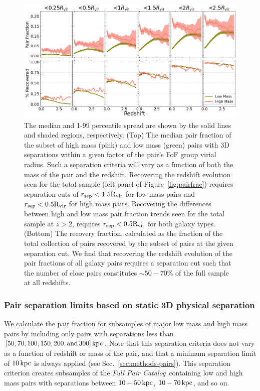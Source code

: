 \documentclass[twocolumn]{aastex631}
\newcommand{\paircat}{\textit{Full Pair Catalog}}
\newcommand{\Rvir}{\ensuremath{\rm R_{vir}}}
\begin{document}
    \begin{figure}[htp]
        \centering
        \includegraphics[width=\textwidth]{pairfrac_vircut.png}
        \caption{\label{fig:vircut}The median and 1-99 percentile spread are shown by the solid lines and shaded regions, respectively. 
        (Top) The median pair fraction of the subset of high mass (pink) and low mass (green) pairs with 3D separations within a given factor of the pair's FoF group virial radius.
        Such a separation criteria will vary as a function of both the mass of the pair and the redshift. 
        Recovering the redshift evolution seen for the total sample (left panel of Figure~\ref{fig:pairfrac}) requires separation cuts of $r_{\mathrm{sep}} < 1.5\Rvir$ for low mass pairs and $r_{\mathrm{sep}} < 0.5\Rvir$ for high mass pairs. 
        Recovering the differences between high and low mass pair fraction trends seen for the total sample at $z>2$, requires $r_{\mathrm{sep}} < 0.5\Rvir$ for both galaxy types. 
        (Bottom) The recovery fraction, calculated as the fraction of the total collection of pairs recovered by the subset of pairs at the given separation cut. 
        We find that recovering the redshift evolution of the pair fractions of all galaxy pairs requires a separation cut such that the number of close pairs constitutes $\sim50-70\%$ of the full sample at all redshifts.
    }
    \end{figure}

\subsubsection{Pair separation limits based on static 3D physical separation} \label{sec:results-frac-sepcut}
    We calculate the pair fraction for subsamples of major low mass and high mass pairs by including only pairs with separations less than $[50,70,100,150,200,\mathrm{and\, }300]\mathrm{\,kpc}$.  
    Note that this separation criteria does not vary as a function of redshift or mass of the pair, and that a minimum separation limit of $10\mathrm{\,kpc}$ is always applied (see Sec.~\ref{sec:methods-pairs}).
    This separation criterion creates subsamples of the \paircat\ containing low and high mass pairs with separations between $10-50\mathrm{\,kpc}$, $10-70\mathrm{\,kpc}$, and so on. 
\end{document}
